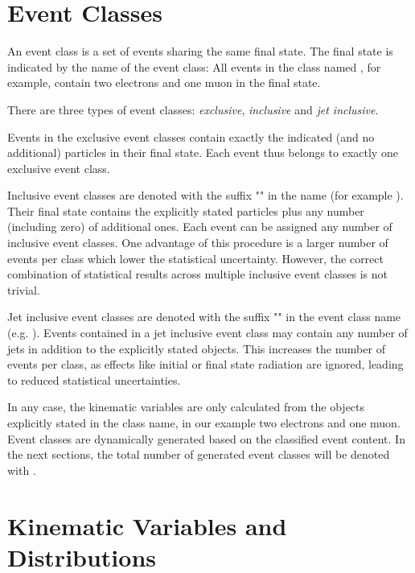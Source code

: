 \section{Event Classes}
\label{sec:event_classes}

An event class is a set of events sharing the same final state. The final state is indicated by the name of the event class: All events in the class named \eventclass{2\Pe + 1\Pmu}, for example, contain two electrons and one muon in the final state.

There are three types of event classes: \emph{exclusive}, \emph{inclusive} and \emph{jet inclusive}.

Events in the exclusive event classes contain exactly the indicated (and no additional) particles in their final state. Each event thus belongs to exactly one exclusive event class.

Inclusive event classes are denoted with the suffix "" in the name (for example ). Their final state contains the explicitly stated particles plus any number (including zero) of additional ones.  Each event can be assigned any number of inclusive event classes. One advantage of this procedure is a larger number of events per class which lower the statistical uncertainty. However, the correct combination of statistical results across multiple inclusive event classes is not trivial.

Jet inclusive event classes are denoted with the suffix "" in the event class name (e.g. ). Events contained in a jet inclusive event class may contain any number of jets in addition to the explicitly stated objects. This increases the number of events per class, as effects like initial or final state radiation are ignored, leading to reduced statistical uncertainties.

In any case, the kinematic variables are only calculated from the objects explicitly stated in the class name, in our example two electrons and one muon.
Event classes are dynamically generated based on the classified event content. In the next sections, the total number of generated event classes will be denoted with \nclasses.

\section{Kinematic Variables and Distributions}
\label{sec:kinematic_distributions}

